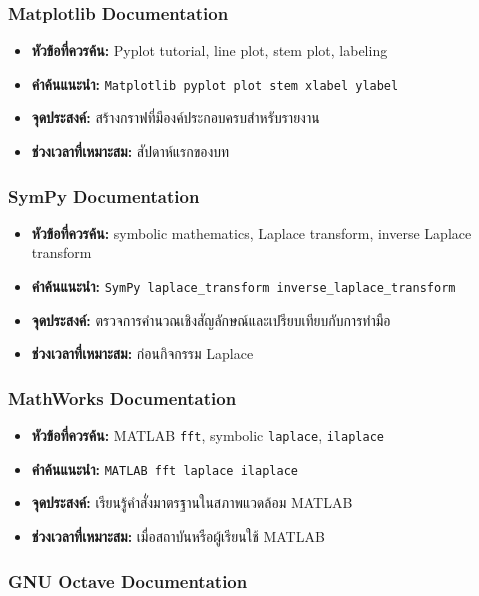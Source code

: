 \subsubsection{Matplotlib Documentation}

\begin{itemize}
    \item \textbf{หัวข้อที่ควรค้น:} Pyplot tutorial, line plot, stem plot, labeling
    \item \textbf{คำค้นแนะนำ:} \texttt{Matplotlib pyplot plot stem xlabel ylabel}
    \item \textbf{จุดประสงค์:} สร้างกราฟที่มีองค์ประกอบครบสำหรับรายงาน
    \item \textbf{ช่วงเวลาที่เหมาะสม:} สัปดาห์แรกของบท
\end{itemize}

\subsubsection{SymPy Documentation}

\begin{itemize}
    \item \textbf{หัวข้อที่ควรค้น:} symbolic mathematics, Laplace transform, inverse Laplace transform
    \item \textbf{คำค้นแนะนำ:} \texttt{SymPy laplace\_transform inverse\_laplace\_transform}
    \item \textbf{จุดประสงค์:} ตรวจการคำนวณเชิงสัญลักษณ์และเปรียบเทียบกับการทำมือ
    \item \textbf{ช่วงเวลาที่เหมาะสม:} ก่อนกิจกรรม Laplace
\end{itemize}

\subsubsection{MathWorks Documentation}

\begin{itemize}
    \item \textbf{หัวข้อที่ควรค้น:} MATLAB \texttt{fft}, symbolic \texttt{laplace}, \texttt{ilaplace}
    \item \textbf{คำค้นแนะนำ:} \texttt{MATLAB fft laplace ilaplace}
    \item \textbf{จุดประสงค์:} เรียนรู้คำสั่งมาตรฐานในสภาพแวดล้อม MATLAB
    \item \textbf{ช่วงเวลาที่เหมาะสม:} เมื่อสถาบันหรือผู้เรียนใช้ MATLAB
\end{itemize}

\subsubsection{GNU Octave Documentation}

